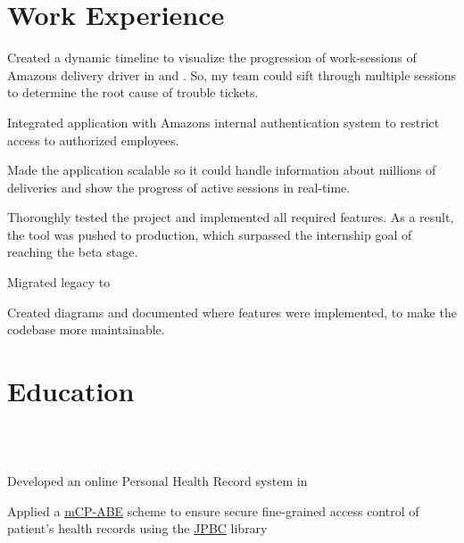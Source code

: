 \documentclass[]{resume-openfont}
\begin{document}
\section{Work Experience}
\begin{tightemize}
    \item Created a dynamic timeline to visualize the progression of work-sessions of Amazon\textquotesingle{}s delivery driver in  and . So, my team could sift through multiple sessions to determine the root cause of trouble tickets.
    \item Integrated application with Amazon\textquotesingle{}s internal authentication system to restrict access to authorized employees.
    \item Made the application scalable so it could handle information about millions of deliveries and show the progress of active sessions in real-time.
    \item Thoroughly tested the project and implemented all required features. As a result, the tool was pushed to production, which surpassed the internship goal of reaching the beta stage.
\end{tightemize}
\sectionsep
{}
\begin{tightemize}
    \item Migrated legacy  to 
    \item Created  diagrams and documented where features were implemented, to make the codebase more maintainable.
\end{tightemize}
\sectionsep

%
%
\section{Education}

\hfill{}\\
\hfill{}\\
\smallSep

\begin{tightemize}
    \item Developed an online Personal Health Record system in 
    \item Applied a
    \href{https://link.springer.com/chapter/10.1007/978-3-642-10838-9\_23}{mCP-ABE} scheme to ensure secure fine-grained access control of patient's health records using the \href{http://gas.dia.unisa.it/projects/jpbc/}{JPBC} library
\end{tightemize}
\end{document}
